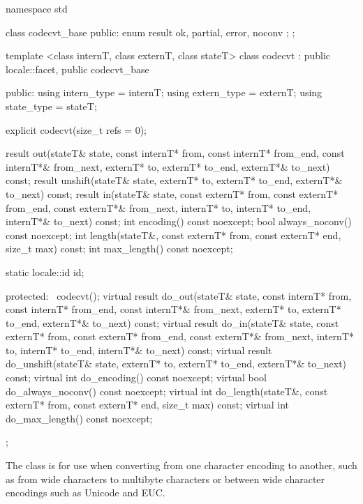 %
\begin{codeblock}
namespace std {
  class codecvt_base {
  public:
    enum result { ok, partial, error, noconv };
  };

  template <class internT, class externT, class stateT>
  class codecvt : public locale::facet, public codecvt_base {
  public:
    using intern_type = internT;
    using extern_type = externT;
    using state_type  = stateT;

    explicit codecvt(size_t refs = 0);

    result out(stateT& state,
               const internT* from, const internT* from_end, const internT*& from_next,
               externT*   to,       externT* to_end, externT*& to_next) const;
    result unshift(stateT& state,
                   externT*   to,        externT* to_end, externT*& to_next) const;
    result in(stateT& state,
              const externT* from, const externT* from_end, const externT*& from_next,
              internT*   to,       internT* to_end, internT*& to_next) const;
    int encoding() const noexcept;
    bool always_noconv() const noexcept;
    int length(stateT&, const externT* from, const externT* end,
               size_t max) const;
    int max_length() const noexcept;

    static locale::id id;

  protected:
    ~codecvt();
    virtual result do_out(stateT& state,
                          const internT* from, const internT* from_end, const internT*& from_next,
                          externT* to,         externT* to_end, externT*& to_next) const;
    virtual result do_in(stateT& state,
                         const externT* from, const externT* from_end, const externT*& from_next,
                         internT* to,         internT* to_end, internT*& to_next) const;
    virtual result do_unshift(stateT& state,
                              externT* to,         externT* to_end, externT*& to_next) const;
    virtual int do_encoding() const noexcept;
    virtual bool do_always_noconv() const noexcept;
    virtual int do_length(stateT&, const externT* from,
                          const externT* end, size_t max) const;
    virtual int do_max_length() const noexcept;
  };
}
\end{codeblock}

\pnum
The class
is for use when
converting from one character encoding to another, such as from wide characters
to multibyte  characters or between wide character encodings such as
Unicode and EUC.

